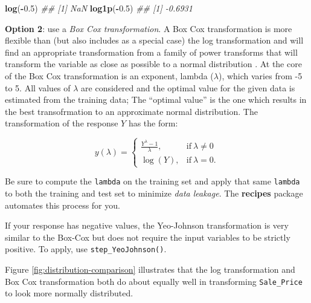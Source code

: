\documentclass[]{krantz}
\makeatletter
\newenvironment{Shaded}{\begin{snugshade}}{\end{snugshade}}
\newcommand{\CommentTok}[1]{\textcolor[rgb]{0.37,0.37,0.37}{\textit{#1}}}
\newcommand{\FloatTok}[1]{\textcolor[rgb]{0.06,0.06,0.06}{#1}}
\newcommand{\KeywordTok}[1]{\textcolor[rgb]{0.27,0.27,0.27}{\textbf{#1}}}
\newcommand{\NormalTok}[1]{#1}
\newcommand{\OperatorTok}[1]{\textcolor[rgb]{0.43,0.43,0.43}{\textbf{#1}}}
\newenvironment{kframe}{%
\medskip{}
\setlength{\fboxsep}{.8em}
 \def\at@end@of@kframe{}%
 \ifinner\ifhmode%
  \def\at@end@of@kframe{\end{minipage}}%
  \begin{minipage}{\columnwidth}%
 \fi\fi%
 \def\FrameCommand##1{\hskip\@totalleftmargin \hskip-\fboxsep
 \colorbox{shadecolor}{##1}\hskip-\fboxsep
     \hskip-\linewidth \hskip-\@totalleftmargin \hskip\columnwidth}%
 \MakeFramed {\advance\hsize-\width
   \@totalleftmargin\z@ \linewidth\hsize
   \@setminipage}}%
 {\par\unskip\endMakeFramed%
 \at@end@of@kframe}
\newenvironment{block}[1]
  {
  \begin{itemize}
  \renewcommand{\labelitemi}{
    \raisebox{-.7\height}[0pt][0pt]{
      {\setkeys{Gin}{width=3em,keepaspectratio}\texttt{[image: icons/\#1]}}
    }
  }
  \setlength{\fboxsep}{1em}
  \begin{kframe}
  \item
  }
  {
  \end{kframe}
  \end{itemize}
  }
\newenvironment{warning}
  {\begin{block}{warning}}
  {\end{block}}
\renewenvironment{Shaded}{\begin{kframe}}{\end{kframe}}
\makeatother
\begin{document}
\begin{Shaded}
\begin{Highlighting}[]
\KeywordTok{log}\NormalTok{(}\OperatorTok{-}\FloatTok{0.5}\NormalTok{)}
\CommentTok{## [1] NaN}
\KeywordTok{log1p}\NormalTok{(}\OperatorTok{-}\FloatTok{0.5}\NormalTok{)}
\CommentTok{## [1] -0.6931}
\end{Highlighting}
\end{Shaded}

\textbf{Option 2}: use a \emph{Box Cox transformation}. A Box Cox transformation is more flexible than (but also includes as a special case) the log transformation and will find an appropriate transformation from a family of power transforms that will transform the variable as close as possible to a normal distribution \citep{box1964analysis, carroll1981prediction}. At the core of the Box Cox transformation is an exponent, lambda (\(\lambda\)), which varies from -5 to 5. All values of \(\lambda\) are considered and the optimal value for the given data is estimated from the training data; The ``optimal value'' is the one which results in the best transofrmation to an approximate normal distribution. The transformation of the response \(Y\) has the form:

\begin{equation} 
 y(\lambda) =
\begin{cases}
   \frac{Y^\lambda-1}{\lambda}, & \text{if}\ \lambda \neq 0 \\
   \log\left(Y\right), & \text{if}\ \lambda = 0.
\end{cases}
\end{equation}

\begin{warning}
Be sure to compute the \texttt{lambda} on the training set and apply
that same \texttt{lambda} to both the training and test set to minimize
\emph{data leakage}. The \textbf{recipes} package automates this process
for you.

If your response has negative values, the Yeo-Johnson transformation is
very similar to the Box-Cox but does not require the input variables to
be strictly positive. To apply, use \texttt{step\_YeoJohnson()}.
\end{warning}

Figure \ref{fig:distribution-comparison} illustrates that the log transformation and Box Cox transformation both do about equally well in transforming \texttt{Sale\_Price} to look more normally distributed.
\end{document}
